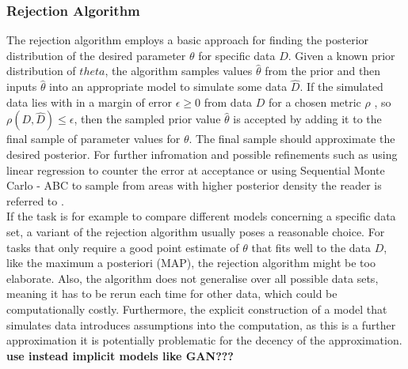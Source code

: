 \documentclass[a4paper, 11pt]{article}
\begin{document}
\subsubsection{Rejection Algorithm}
The rejection algorithm employs a basic approach for finding the posterior distribution of the desired parameter $\theta$ for specific data $D$. Given a known prior distribution of $theta$, the algorithm samples values $\hat{\theta}$ from the prior and then inputs $\hat{\theta}$ into an appropriate model to simulate some data $\hat{D}$. If the simulated data lies with in a margin of error $\epsilon \geq 0$ from data $D$ for a chosen metric $\rho$ , so $\rho(D, \hat{D}) \leq \epsilon$, then the sampled prior value $\hat{\theta}$ is accepted by adding it to the final sample of parameter values for $\theta$. The final sample should approximate the desired posterior. For further infromation and possible refinements such as using linear regression to counter the error at acceptance or using Sequential Monte Carlo - ABC to sample from areas with higher posterior density the reader is referred to \cite{csillery2010approximate}. \\
If the task is for example to compare different models concerning a specific data set, a variant of the rejection algorithm usually poses a reasonable choice. For tasks that only require a good point estimate of $\theta$ that fits well to the data $D$, like the maximum a posteriori (MAP), the rejection algorithm might be too elaborate. Also, the algorithm does not generalise over all possible data sets, meaning it has to be rerun each time for other data, which could be computationally costly. Furthermore, the explicit construction of a model that simulates data introduces assumptions into the computation, as this is a further approximation it is potentially problematic for the decency of the approximation. \textbf{use instead implicit models like GAN???} \\
\end{document}

